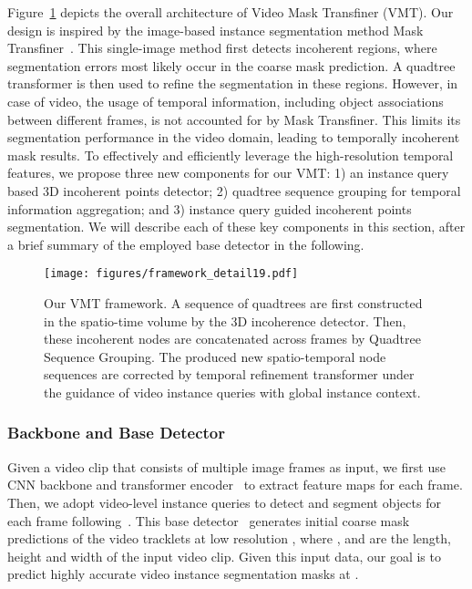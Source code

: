 \documentclass[runningheads]{llncs}
\begin{document}
Figure~\ref{fig:framework} depicts
the overall architecture of Video Mask Transfiner (VMT). Our design is inspired by the image-based instance segmentation method Mask Transfiner~\cite{transfiner}. This single-image method first detects  incoherent regions, where segmentation errors  most likely occur in the coarse mask prediction. A quadtree transformer is then used to refine the segmentation in these regions. However, in case of video, the usage of temporal information, including object associations between different frames, is not accounted for by Mask Transfiner. This limits its segmentation performance in the video domain, leading to temporally incoherent mask results. To effectively and efficiently leverage the high-resolution temporal features, we propose three new components for our VMT: 1) an instance query based 3D incoherent points detector; 2) quadtree sequence grouping for temporal information aggregation; and 3) instance query guided incoherent points segmentation. We will describe each of these key components in this section, after a brief summary of the employed base detector in the following.

\begin{figure}[!t]
	\centering
	\texttt{[image: figures/framework\_detail19.pdf]}
\caption{Our VMT framework. A sequence of quadtrees are first constructed in the spatio-time volume by the 3D incoherence detector. Then, these incoherent nodes are concatenated across frames by Quadtree Sequence Grouping. The produced new spatio-temporal node sequences are corrected by temporal refinement transformer under the guidance of video instance queries with global instance context.}
	\label{fig:framework}
\end{figure}

\subsubsection{Backbone and Base Detector} Given a
video clip that consists of multiple image frames as input, we first use CNN backbone and transformer encoder~\cite{zhu2020deformable} to extract feature maps for each frame. Then, we adopt video-level instance queries to detect and segment objects for each frame following~\cite{wu2021seqformer}. This base detector~\cite{wu2021seqformer} generates initial coarse mask predictions of the video tracklets at low resolution , where ,  and  are the length, height and width of the input video clip. Given this input data, our goal is to predict highly accurate video instance segmentation masks at .
\end{document}
